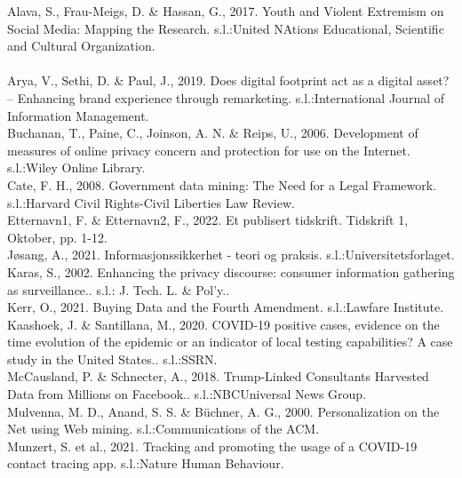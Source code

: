 \documentclass[11pt]{article}
\begin{document}
Alava, S., Frau-Meigs, D. \& Hassan, G., 2017. Youth and Violent Extremism on Social Media: Mapping the Research. s.l.:United NAtions Educational, Scientific and Cultural Organization.\\ \\

Arya, V., Sethi, D. \& Paul, J., 2019. Does digital footprint act as a digital asset? – Enhancing brand experience through remarketing. s.l.:International Journal of Information Management. \\ 

Buchanan, T., Paine, C., Joinson, A. N. \& Reips, U., 2006. Development of measures of online privacy concern and protection for use on the Internet. s.l.:Wiley Online Library. \\

Cate, F. H., 2008. Government data mining: The Need for a Legal Framework. s.l.:Harvard Civil Rights-Civil Liberties Law Review. \\

Etternavn1, F. \& Etternavn2, F., 2022. Et publisert tidskrift. Tidskrift 1, Oktober, pp. 1-12. \\

Jøsang, A., 2021. Informasjonssikkerhet - teori og praksis. s.l.:Universitetsforlaget. \\

Karas, S., 2002. Enhancing the privacy discourse: consumer information gathering as surveillance.. s.l.: J. Tech. L. \& Pol'y.. \\

Kerr, O., 2021. Buying Data and the Fourth Amendment. s.l.:Lawfare Institute. \\

Kaashoek, J. \& Santillana, M., 2020. COVID-19 positive cases, evidence on the time evolution of the epidemic or an indicator of local testing capabilities? A case study in the United States.. s.l.:SSRN. \\

McCausland, P. \& Schnecter, A., 2018. Trump-Linked Consultants Harvested Data from Millions on Facebook.. s.l.:NBCUniversal News Group. \\

Mulvenna, M. D., Anand, S. S. \& Büchner, A. G., 2000. Personalization on the Net using Web mining. s.l.:Communications of the ACM. \\

Munzert, S. et al., 2021. Tracking and promoting the usage of a COVID-19 contact tracing app. s.l.:Nature Human Behaviour. \\
\end{document}
